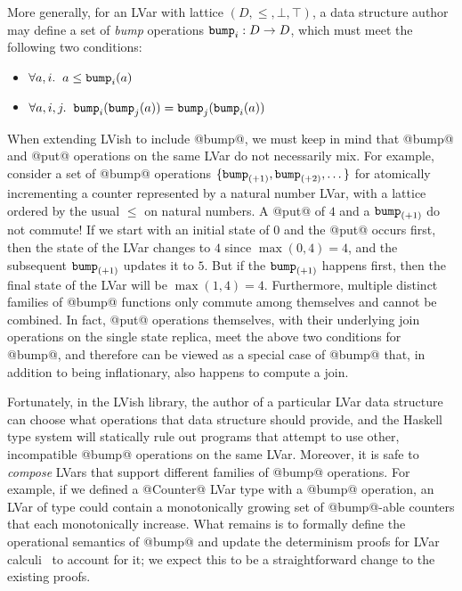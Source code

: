 More generally, for an LVar with lattice $(D,\leq,\bot, \top)$, a data
structure author may define a set of {\em bump} operations $\mbox{\texttt{bump}}_i :
D \rightarrow D$, which must meet the following two conditions:
\begin{itemize}
\item $\forall a, i.     \;\; a \leq \mbox{\texttt{bump}}_i(a) $
\item $\forall a, i, j.  \;\; \mbox{\texttt{bump}}_i(\mbox{\texttt{bump}}_j(a)) = \mbox{\texttt{bump}}_j(\mbox{\texttt{bump}}_i(a)) $
\end{itemize}
When extending LVish to include @bump@, we must keep in mind that
@bump@ and @put@ operations on the same LVar do not necessarily mix.
For example, consider a set of @bump@ operations $\{\mbox{\texttt{bump}}_{(+1)},
\mbox{\texttt{bump}}_{(+2)}, \dots \}$ for atomically incrementing a counter
represented by a natural number LVar, with a lattice ordered by the
usual $\leq$ on natural numbers.  A @put@ of $4$ and a $\mbox{\texttt{bump}}_{(+1)}$
do not commute!  If we start with an initial state of $0$ and the
@put@ occurs first, then the state of the LVar changes to $4$ since
$\max(0, 4) = 4$, and the subsequent $\mbox{\texttt{bump}}_{(+1)}$ updates it to $5$.
But if the $\mbox{\texttt{bump}}_{(+1)}$ happens first, then the final state of the
LVar will be $\max(1, 4) = 4$.  Furthermore, multiple distinct
families of @bump@ functions only commute among themselves and cannot
be combined.  In fact, @put@ operations themselves, with their
underlying join operations on the single state replica, meet the above
two conditions for @bump@, and therefore can be viewed as a special
case of @bump@ that, in addition to being inflationary, also happens
to compute a join.

Fortunately, in the LVish library, the author of a particular LVar
data structure can choose what operations that data structure should
provide, and the Haskell type system will statically rule out programs
that attempt to use other, incompatible @bump@ operations on the same
LVar.  Moreover, it is safe to \emph{compose} LVars that support
different families of @bump@ operations.  For example, if we defined a
@Counter@ LVar type with a @bump@ operation, an LVar of type  could contain a monotonically growing set of @bump@-able
counters that each monotonically increase.  What remains is to
formally define the operational semantics of @bump@ and update the
determinism proofs for LVar calculi~\cite{LVars-paper, Freeze-paper}
to account for it; we expect this to be a straightforward change to
the existing proofs.


